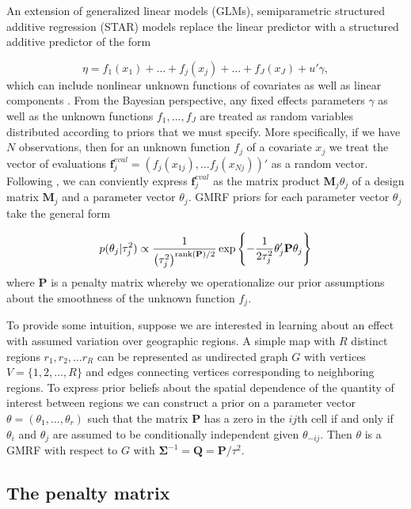 An extension of generalized linear models (GLMs), semiparametric structured additive regression (STAR) models replace the linear predictor with a structured additive predictor of the form

{\singlespacing
$$\eta = f_1(x_1) + \ldots + f_j(x_j) + \ldots + f_J(x_J) + u'\gamma, $$
}
%
\noindent which can include nonlinear unknown functions of covariates as well as linear components . From the Bayesian perspective, any fixed effects parameters $\gamma$ as well as the unknown functions $f_1, \dots, f_J$ are treated as random variables distributed according to priors that we must specify. More specifically, if we have $N$ observations, then for an unknown function $f_j$ of a covariate $x_j$ we treat the vector of evaluations $\mathbf{f}_j^{eval} = \left(f_j(x_{1j}), \dots f_j(x_{Nj})\right)' $ as a random vector. Following , we can conviently express $\mathbf{f}_j^{eval}$ as the matrix product $\mathbf{M}_j \theta_j$ of a design matrix $\mathbf{M}_j$ and a parameter vector $\theta_j$. GMRF priors for each parameter vector $\theta_j$ take the general form

{\singlespacing
$$
p(\theta_j | \tau^2_j) 
\propto 
\frac{1}{\left(\tau^2_j\right)^{{\rm rank}(\mathbf{P})/2} }
\exp{\left\{-\frac{1}{2\tau^2_j} \theta_j' \mathbf{P} \theta_j\right\}}
$$ 
}
% 
\noindent where $\mathbf{P}$ is a penalty matrix whereby we operationalize our prior assumptions about the smoothness of the unknown function $f_j$. 

To provide some intuition, suppose we are interested in learning about an effect with assumed variation over geographic regions.  A simple map with $R$ distinct regions $r_1, r_2, \dots r_R$ can be represented as undirected graph $G$ with vertices $V = \{1, 2, \dots, R\}$ and edges connecting vertices corresponding to neighboring regions. To express prior beliefs about the spatial dependence of the quantity of interest between regions we can construct a prior on a parameter vector $\theta = (\theta_1, \dots, \theta_r)$ such that the matrix $\mathbf{P}$ has a zero in the $ij$th cell if and only if $\theta_i$ and $\theta_j$ are assumed to be conditionally independent given $\theta_{-ij}$. Then $\theta$ is a GMRF with respect to $G$ with $\boldsymbol{\Sigma}^{-1} = \mathbf{Q} = \mathbf{P}/\tau^2$. 

\subsection{The penalty matrix} 

